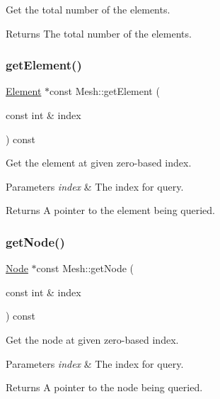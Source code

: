 Get the total number of the elements. 

\begin{DoxyReturn}{Returns}
The total number of the elements. 
\end{DoxyReturn}
\mbox{\label{class_mesh_ada2ae7b8640a3999780d7e738ee4154e}} 
\subsubsection{\texorpdfstring{get\+Element()}{getElement()}}
{\footnotesize\ttfamily \mbox{\hyperlink{class_element}{Element}} $\ast$const Mesh\+::get\+Element (\begin{DoxyParamCaption}\item[{const int \&}]{index }\end{DoxyParamCaption}) const}



Get the element at given zero-\/based index. 


\begin{DoxyParams}{Parameters}
{\em index} & The index for query. \\
\hline
\end{DoxyParams}
\begin{DoxyReturn}{Returns}
A pointer to the element being queried. 
\end{DoxyReturn}
\mbox{\label{class_mesh_a071a8dfe15c00fcabc9c4071306487d4}} 
\subsubsection{\texorpdfstring{get\+Node()}{getNode()}}
{\footnotesize\ttfamily \mbox{\hyperlink{class_node}{Node}} $\ast$const Mesh\+::get\+Node (\begin{DoxyParamCaption}\item[{const int \&}]{index }\end{DoxyParamCaption}) const}



Get the node at given zero-\/based index. 


\begin{DoxyParams}{Parameters}
{\em index} & The index for query. \\
\hline
\end{DoxyParams}
\begin{DoxyReturn}{Returns}
A pointer to the node being queried. 
\end{DoxyReturn}
\mbox{\label{class_mesh_ae596a597115563fb308d99e5e15a62e6}} 
